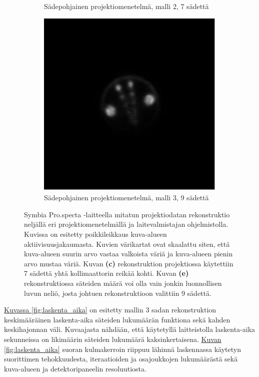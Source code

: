 \begin{figure}[H]
\begin{subfigure}[b]{.25\textwidth}
        \caption{Sädepohjainen projektiomenetelmä, malli 2, 7 sädettä}
    \end{subfigure}%
    \hspace{.075\textwidth}%
    \begin{subfigure}[b]{.25\textwidth}
        \includegraphics[width=\linewidth]{kuvat/pro_specta_rekonstruktio_proj1_malli3_nRay9.pdf}
        \caption{Sädepohjainen projektiomenetelmä, malli 3, 9 sädettä}
    \end{subfigure}
    \caption{Symbia Pro.specta -laitteella mitatun projektiodatan rekonstruktio neljällä eri projektiomenetelmällä ja laitevalmistajan ohjelmistolla. Kuvissa on esitetty poikkileikkaus kuva-alueen aktiivisuusjakaumasta. Kuvien värikartat ovat skaalattu siten, että kuva-alueen suurin arvo vastaa valkoista väriä ja kuva-alueen pienin arvo mustaa väriä. Kuvan \textbf{(c)} rekonstruktion projektiossa käytettiin 7 sädettä yhtä kollimaattorin reikää kohti. Kuvan \textbf{(e)} rekonstruktiossa säteiden määrä voi olla vain jonkin luonnollisen luvun neliö, josta johtuen rekonstruktioon valittiin 9 sädettä.}
    \label{fig:rekonstruktiot}
\end{figure}

\hyperref[fig:laskenta_aika]{Kuvassa \ref*{fig:laskenta_aika}} on esitetty mallin 3 sadan rekonstruktion keskimääräinen laskenta-aika säteiden lukumäärän funktiona sekä kahden keskihajonnan väli. Kuvaajasta nähdään, että käytetyllä laitteistolla laskenta-aika sekunneissa on likimäärin säteiden lukumäärä kaksinkertaisena. \hyperref[fig:laskenta_aika]{Kuvan \ref*{fig:laskenta_aika}} suoran kulmakerroin riippuu lähinnä laskennassa käytetyn suorittimen tehokkuudesta, iteraatioiden ja osajoukkojen lukumäärästä sekä kuva-alueen ja detektoripaneelin resoluutiosta.

